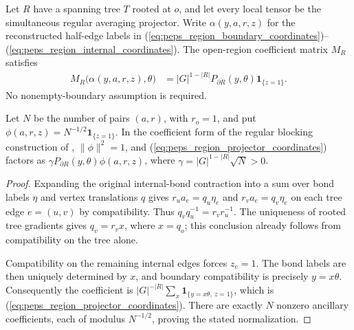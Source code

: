 \begin{lemma}%
    \label{thm:peps_regular_region_projector_coordinates}
    \leanok
    Let $R$ have a spanning tree $T$ rooted at $o$, and let every local
    tensor be the simultaneous regular averaging projector. Write
    $\alpha(y,a,r,z)$ for the reconstructed half-edge labels in
    (\ref{eq:peps_region_boundary_coordinates})--(\ref{eq:peps_region_internal_coordinates}).
    The open-region coefficient matrix $M_R$ satisfies
    \begin{align}
        M_R\bigl(\alpha(y,a,r,z),\theta\bigr)
         & = |G|^{1-|R|}P_{\partial R}(y,\theta)
        \mathbf 1_{\{z=1\}}.
        \label{eq:peps_region_projector_coordinates}
    \end{align}
    No nonempty-boundary assumption is required.

    Let $N$ be the number of pairs $(a,r)$, with $r_o=1$, and put
    $\phi(a,r,z)=N^{-1/2}\mathbf 1_{\{z=1\}}$. In the coefficient form of the regular blocking construction
    of \cite[\S6.2--6.3]{Schuch2010PEPS}, $\|\phi\|^2=1$,
    and (\ref{eq:peps_region_projector_coordinates}) factors as
    $\gamma P_{\partial R}(y,\theta)\phi(a,r,z)$, where
    $\gamma=|G|^{1-|R|}\sqrt N>0$.
\end{lemma}
\begin{proof}\leanok
    Expanding the original internal-bond contraction into a sum over bond
    labels $\eta$ and vertex translations $q$ gives
    $r_ua_e=q_u\eta_e$ and $r_va_e=q_v\eta_e$ on each tree edge
    $e=(u,v)$ by compatibility.
    Thus $q_vq_u^{-1}=r_vr_u^{-1}$. The uniqueness of rooted tree
    gradients gives $q_v=r_vx$, where $x=q_o$; this conclusion already
    follows from compatibility on the tree alone.

    Compatibility on the remaining internal edges forces $z_e=1$.
    The bond labels are then uniquely determined by $x$, and boundary
    compatibility is precisely $y=x\theta$. Consequently the coefficient
    is $|G|^{-|R|}\sum_x\mathbf 1_{\{y=x\theta,\ z=1\}}$,
    which is (\ref{eq:peps_region_projector_coordinates}). There are
    exactly $N$ nonzero ancillary coefficients, each of modulus
    $N^{-1/2}$, proving the stated normalization.
\end{proof}

